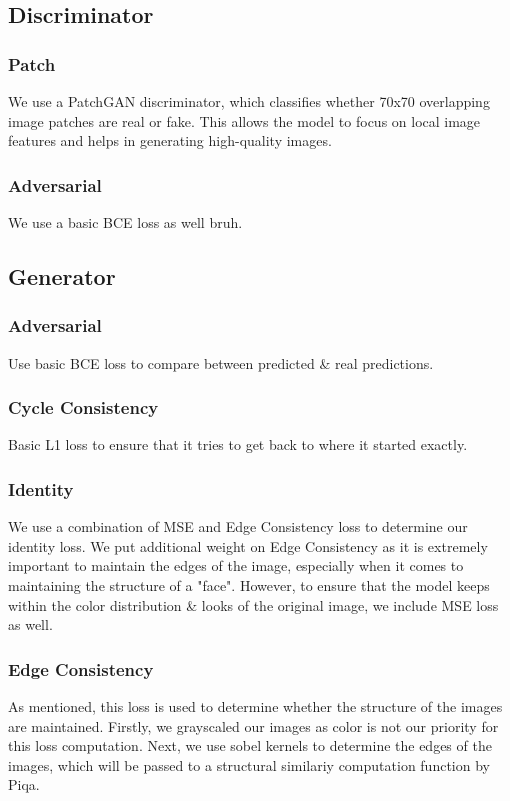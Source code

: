 \documentclass[twoside,english,notitlepage]{report}
\begin{document}
\subsection{Discriminator}
\subsubsection{Patch}
We use a PatchGAN discriminator, which classifies whether 70x70 overlapping image patches are real or fake. This allows the model to focus on local image features and helps in generating high-quality images.

\subsubsection{Adversarial}
We use a basic BCE loss as well bruh.

\subsection{Generator}

\subsubsection{Adversarial}
Use basic BCE loss to compare between predicted \& real predictions. 

\subsubsection{Cycle Consistency}
Basic L1 loss to ensure that it tries to get back to where it started exactly. 

\subsubsection{Identity}
We use a combination of MSE and Edge Consistency loss to determine our identity loss. We put additional weight on Edge Consistency as it is extremely important to maintain the edges of the image, especially when it comes to maintaining the structure of a "face". However, to ensure that the model keeps within the color distribution \& looks of the original image, we include MSE loss as well. 

\subsubsection{Edge Consistency}
As mentioned, this loss is used to determine whether the structure of the images are maintained. Firstly, we grayscaled our images as color is not our priority for this loss computation. Next, we use sobel kernels to determine the edges of the images, which will be passed to a structural similariy computation function by Piqa. 
\end{document}
